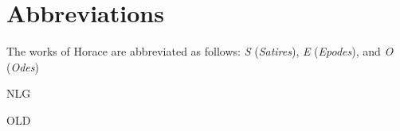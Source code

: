 \chapter{Abbreviations}

The works of Horace are abbreviated as follows: \textit{S} (\textit{Satires}), \textit{E} (\textit{Epodes}), and \textit{O} (\textit{Odes})

\begin{abbreviations}
    \item[NLG] 
    \item[OLD] 
\end{abbreviations}
